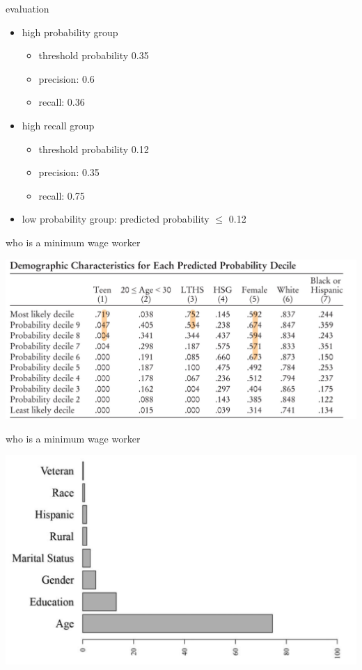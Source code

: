 \documentclass[
  ignorenonframetext,
]{beamer}
\begin{document}
\begin{frame}{evaluation}
  \begin{itemize}
    \item high probability group
    \begin{itemize}
      \item threshold probability 0.35
      \item precision: 0.6
      \item recall: 0.36
    \end{itemize}
    \item high recall group
    \begin{itemize}
      \item threshold probability 0.12
      \item precision: 0.35
      \item recall: 0.75
    \end{itemize}
    \item low probability group: predicted probability $\le$ 0.12
  \end{itemize}
\end{frame}


\begin{frame}{who is a minimum wage worker}
  \begin{center}
    \includegraphics{figure/pdf/decitle.jpg}
  \end{center}
\end{frame}


\begin{frame}{who is a minimum wage worker}
  \begin{center}
    \includegraphics{figure/pdf/tree_importance.png}
  \end{center}
\end{frame}
\end{document}
